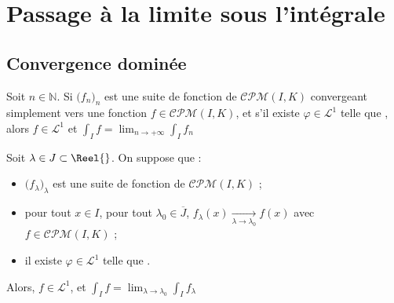 \documentclass[11pt,a4paper,fleqn,pdftex]{report}
\begin{document}
\section{Passage à la limite sous l'intégrale} %
\label{sec:passage_la_limite_sous_l_integrale}
\subsection{Convergence dominée} %
\label{sub:convergence_dominee}
\begin{itheorem}
\label{thm:convergence_dominee}
    Soit $n\in \mathbb{N}$. Si $\big( f_n \big)_n$ est une suite de fonction de $\mathcal{CPM}(I,K) $ convergeant simplement vers une fonction $f \in \mathcal{CPM}(I,K)$, et s'il existe $\varphi \in \mathcal{L}^1 $ telle que ,\newline
    alors $f \in \mathcal{L}^1$ et $\int_I f = \lim_{n \to +\infty} \int_I f_n$
\end{itheorem}
\begin{theorem}
\label{thm:convergence_dominee_reel}
    Soit $\lambda\in J\subset \Reel{}$. On suppose que :
    \begin{itemize}
        \item $\big( f_\lambda \big)_\lambda$ est une suite de fonction de $\mathcal{CPM}(I,K)$ ;
        \item pour tout $x\in I$, pour tout $\lambda_0\in \overline{J}$, $f_\lambda (x) \xrightarrow[\lambda \to \lambda_0]{} f (x)$ avec $f \in \mathcal{CPM}(I,K)$ ;
        \item il existe $\varphi \in \mathcal{L}^1 $ telle que .
    \end{itemize}
    Alors, $f \in \mathcal{L}^1$, et $\int_I f = \lim_{\lambda \to \lambda_0} \int_I f_\lambda$
\end{theorem}
\end{document}
